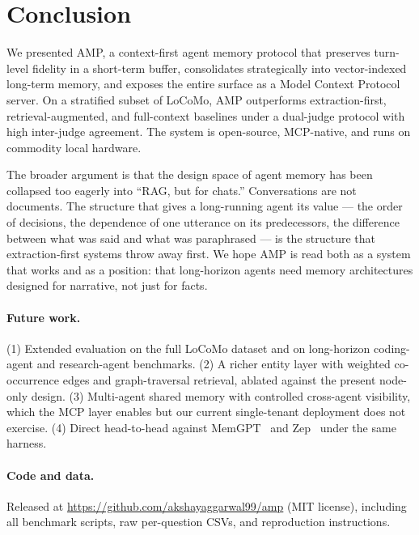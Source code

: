 \section{Conclusion}
\label{sec:conclusion}

We presented AMP, a context-first agent memory protocol that preserves turn-level fidelity in a short-term buffer, consolidates strategically into vector-indexed long-term memory, and exposes the entire surface as a Model Context Protocol server. On a stratified subset of LoCoMo, AMP outperforms extraction-first, retrieval-augmented, and full-context baselines under a dual-judge protocol with high inter-judge agreement. The system is open-source, MCP-native, and runs on commodity local hardware.

The broader argument is that the design space of agent memory has been collapsed too eagerly into ``RAG, but for chats.'' Conversations are not documents. The structure that gives a long-running agent its value --- the order of decisions, the dependence of one utterance on its predecessors, the difference between what was said and what was paraphrased --- is the structure that extraction-first systems throw away first. We hope AMP is read both as a system that works and as a position: that long-horizon agents need memory architectures designed for narrative, not just for facts.

\paragraph{Future work.} (1) Extended evaluation on the full LoCoMo dataset and on long-horizon coding-agent and research-agent benchmarks. (2) A richer entity layer with weighted co-occurrence edges and graph-traversal retrieval, ablated against the present node-only design. (3) Multi-agent shared memory with controlled cross-agent visibility, which the MCP layer enables but our current single-tenant deployment does not exercise. (4) Direct head-to-head against MemGPT~\citep{memgpt} and Zep~\citep{zep} under the same harness.

\paragraph{Code and data.} Released at \url{https://github.com/akshayaggarwal99/amp} (MIT license), including all benchmark scripts, raw per-question CSVs, and reproduction instructions.
